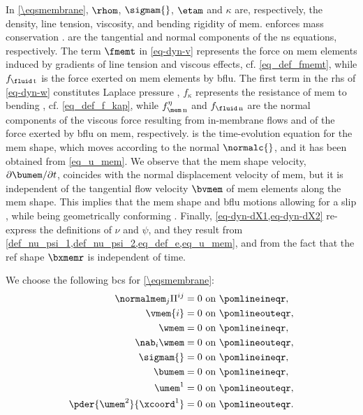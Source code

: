 In \cref{\eqsmembrane}, $\rhom$, $\sigmam{}$, $\etam$ and $\kappa$ are, respectively, the density, line tension, viscosity, and bending rigidity of \ac{mem}.
 enforces mass conservation \cite{landauFluidMechanics1987}.
 are the tangential and normal components of the \ac{ns} equations, respectively.
The term $\fmemt$ in \cref{eq-dyn-v} represents the force on \ac{mem} elements induced by gradients of line tension and viscous effects, cf. \cref{eq_def_fmemt}, while $f_{\fluid\, \text{t}}$ is the force exerted on \ac{mem} elements by \ac{bflu}.
%
The first term in the \ac{rhs} of \cref{eq-dyn-w} constitutes Laplace pressure \cite{degennesCapillarityWettingPhenomena2004,landauFluidMechanics1987},  $f_\kappa$ represents the resistance of \ac{mem} to bending \cite{helfrichElasticPropertiesLipid1973}, cf. \cref{eq_def_f_kap},  while $f^\eta_{\mem\, \text{n}}$ and $f_{\fluid\, \text{n}}$ are  the  normal components of the viscous force resulting from in-membrane flows \cite{arroyoRelaxationDynamicsFluid2009i} and of the force exerted by \ac{bflu} on \ac{mem}, respectively.
%
 is the time-evolution equation for the \ac{mem} shape, which moves according to the normal $\normalc{}$, and it has been obtained from  \cref{eq_u_mem}.
We observe that the \ac{mem} shape velocity, $\partial \bumem / \partial t$, coincides with the normal displacement velocity of \ac{mem}, but  it is independent of the tangential flow velocity $\bvmem$ of \ac{mem} elements along the \ac{mem} shape.
This implies that the \ac{mem} shape and \ac{bflu} motions allowing for a slip \cite{landauFluidMechanics1987}, while  being geometrically conforming \cite{kamenskyLectureNotesMAE}.
%
Finally, \cref{eq-dyn-dX1,eq-dyn-dX2} re-express the definitions of $\nu$ and $\psi$, and  they result from \cref{def_nu_psi_1,def_nu_psi_2,eq_def_e,eq_u_mem}, and from the fact that the \ac{ref} shape $\bxmemr$ is independent of time.


We choose the following \acp{bc} for \cref{\eqsmembrane}:
\begin{align}
        \label{bc_fl_mem_mem_1}
        \normalmem_j \Pi^{ij}     & = 0 \text{ on } \pomlineineqr,  \\
        \label{bc_fl_mem_mem_2}
        \vmem{i}                  & = 0 \text{ on } \pomlineouteqr, \\
        \label{bc_fl_mem_mem_3}
        \wmem                     & = 0 \text{ on } \pomlineineqr,  \\
        \label{bc_fl_mem_mem_4}
        \nab_i \wmem              & = 0 \text{ on } \pomlineouteqr, \\
        \label{bc_fl_mem_mem_5}
        \sigmam{}                 & = 0 \text{ on } \pomlineineqr,  \\
        \label{bc_fl_mem_mem_6}
        \bumem                    & = 0 \text{ on } \pomlineineqr,  \\
        \label{bc_fl_mem_mem_7}
        \umem^1                   & = 0 \text{ on } \pomlineouteqr, \\
        \label{bc_fl_mem_mem_8}
        \pder{\umem^2}{\xcoord^1} & = 0 \text{ on } \pomlineouteqr.
\end{align}

